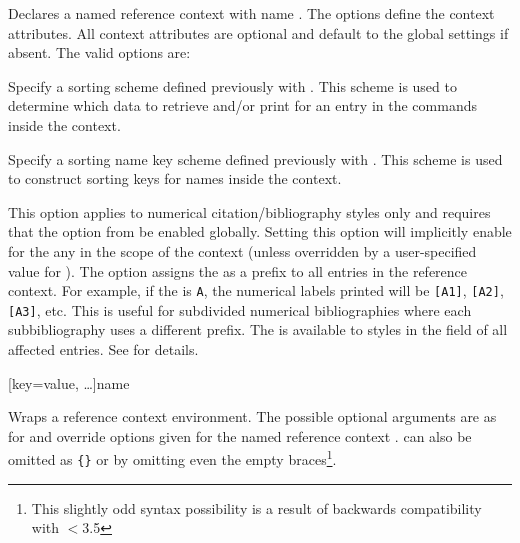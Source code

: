 \begin{ltxsyntax}


Declares a named reference context with name . The  options define the context attributes. All context attributes are optional and default to the global settings if absent. The valid options are:

\begin{optionlist*}


Specify a sorting scheme defined previously with . This scheme is used to determine which data to retrieve and/or print for an entry in the commands inside the context. 


Specify a sorting name key scheme defined previously with . This scheme is used to construct sorting keys for names inside the context.


This option applies to numerical citation\slash bibliography styles only and requires that the  option from  be enabled globally. Setting this option will implicitly enable  for the any  in the scope of the context (unless overridden by a user-specified value for ). The option assigns the  as a prefix to all entries in the reference context. For example, if the  is \texttt{A}, the numerical labels printed will be \texttt{[A1]}, \texttt{[A2]}, \texttt{[A3]}, etc. This is useful for subdivided numerical bibliographies where each subbibliography uses a different prefix. The  is available to styles in the  field of all affected entries. See  for details.

\end{optionlist*}
%

[key=value, \dots]{name}

Wraps a reference context environment. The possible  optional arguments are as for  and override options given for the named reference context .  can also be omitted as \verb+{}+ or by omitting even the empty braces\footnote{This slightly odd syntax possibility is a result of backwards compatibility with \biblatex $<$3.5}.


\end{ltxsyntax}

